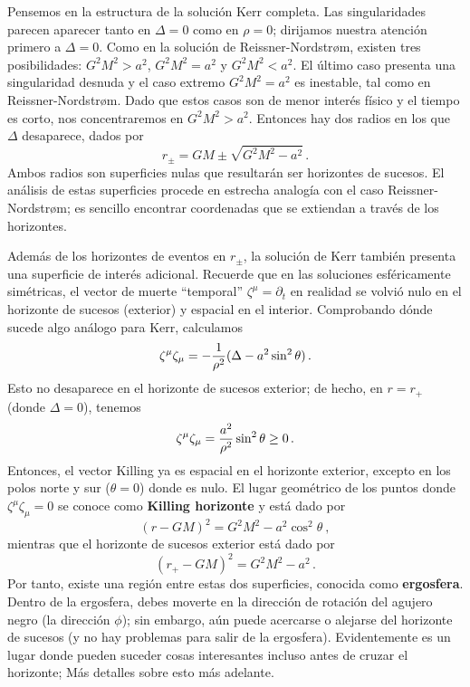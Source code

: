 \documentclass[11pt,b5paper,openany,twoside]{book}
\newcommand{\p}[1]{{\partial_{#1}}}
\begin{document}
Pensemos en la estructura de la solución Kerr completa.
Las singularidades parecen aparecer tanto en $\Delta=0$ como en $\rho=0$; dirijamos nuestra atención primero a $\Delta=0$.
Como en la solución de Reissner-Nordstr{\o}m, existen tres posibilidades: $G^2M^2>a^2$, $G^2M^2=a^2$ y $G^2M^2<a^2$.
El último caso presenta una singularidad desnuda y el caso extremo $G^2M^2=a^2$ es inestable, tal como en Reissner-Nordstr{\o}m.
Dado que estos casos son de menor interés físico y el tiempo es corto, nos concentraremos en $G^2M^2>a^2$.
Entonces hay dos radios en los que $\Delta$ desaparece, dados por
\begin{equation}
r_\pm = GM\pm\sqrt{G^2M^2 - a^2}\,.\label{7.124}
\end{equation}
Ambos radios son superficies nulas que resultarán ser horizontes de sucesos.
El análisis de estas superficies procede en estrecha analogía con el caso Reissner-Nordstr{\o}m; es sencillo encontrar coordenadas que se extiendan a través de los horizontes.

Además de los horizontes de eventos en $r_\pm$, la solución de Kerr también presenta una superficie de interés adicional.
Recuerde que en las soluciones esféricamente simétricas, el vector de muerte ``temporal'' $\zeta^\mu=\p{t}$ en realidad se volvió nulo en el horizonte de sucesos (exterior) y espacial en el interior.
Comprobando dónde sucede algo análogo para Kerr, calculamos
\begin{equation}
\zeta^\mu\zeta_\mu = -{1\over{\rho^2}}(\Delta-a^2\sin^2\theta)\,.
\label{7.125}
\end{equation}
Esto no desaparece en el horizonte de sucesos exterior; de hecho, en $r=r_+$ (donde $\Delta=0$), tenemos
\begin{equation}
\zeta^\mu\zeta_\mu={{a^2}\over{\rho^2}}\sin^2\theta \geq 0\,.
\label{7.126}
\end{equation}
Entonces, el vector Killing ya es espacial en el horizonte exterior, excepto en los polos norte y sur ($\theta=0$) donde es nulo.
El lugar geométrico de los puntos donde $\zeta^\mu\zeta_\mu =0$ se conoce como {\bf Killing horizonte} y está dado por
\begin{equation}
(r-GM)^2 = G^2M^2 - a^2\cos^2\theta\ ,\label{7.127}
\end{equation}
mientras que el horizonte de sucesos exterior está dado por
\begin{equation}
(r_+-GM)^2 = G^2M^2 - a^2\,.\label{7.128}
\end{equation}
Por tanto, existe una región entre estas dos superficies, conocida como {\bf ergosfera}.
Dentro de la ergosfera, debes moverte en la dirección de rotación del agujero negro (la dirección $\phi$); sin embargo, aún puede acercarse o alejarse del horizonte de sucesos (y no hay problemas para salir de la ergosfera).
Evidentemente es un lugar donde pueden suceder cosas interesantes incluso antes de cruzar el horizonte; Más detalles sobre esto más adelante.
\end{document}
